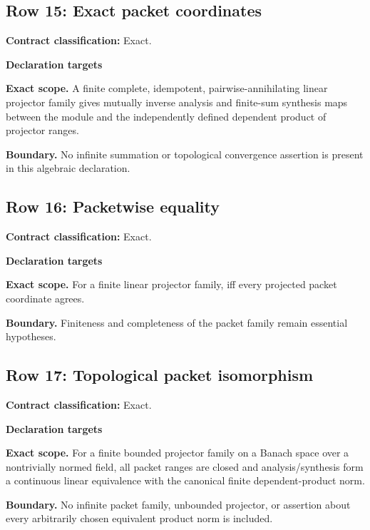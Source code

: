 \subsection{Row 15: Exact packet coordinates}
\label{row:15}
\textbf{Contract classification:} Exact.
\par\smallskip\textbf{Declaration targets}\par
{\small\noindent{}\par}
{\small\noindent{}\par}
{\small\noindent{}\par}
\medskip\noindent\textbf{Exact scope.} A finite complete, idempotent, pairwise-annihilating linear projector family gives mutually inverse analysis and finite-sum synthesis maps between the module and the independently defined dependent product of projector ranges.
\par\smallskip\noindent\textbf{Boundary.} No infinite summation or topological convergence assertion is present in this algebraic declaration.
\medskip
\subsection{Row 16: Packetwise equality}
\label{row:16}
\textbf{Contract classification:} Exact.
\par\smallskip\textbf{Declaration targets}\par
{\small\noindent{}\par}
\medskip\noindent\textbf{Exact scope.} For a finite linear projector family,  iff every projected packet coordinate agrees.
\par\smallskip\noindent\textbf{Boundary.} Finiteness and completeness of the packet family remain essential hypotheses.
\medskip
\subsection{Row 17: Topological packet isomorphism}
\label{row:17}
\textbf{Contract classification:} Exact.
\par\smallskip\textbf{Declaration targets}\par
{\small\noindent{}\par}
{\small\noindent{}\par}
\medskip\noindent\textbf{Exact scope.} For a finite bounded projector family on a Banach space over a nontrivially normed field, all packet ranges are closed and analysis/synthesis form a continuous linear equivalence with the canonical finite dependent-product norm.
\par\smallskip\noindent\textbf{Boundary.} No infinite packet family, unbounded projector, or assertion about every arbitrarily chosen equivalent product norm is included.
\medskip
